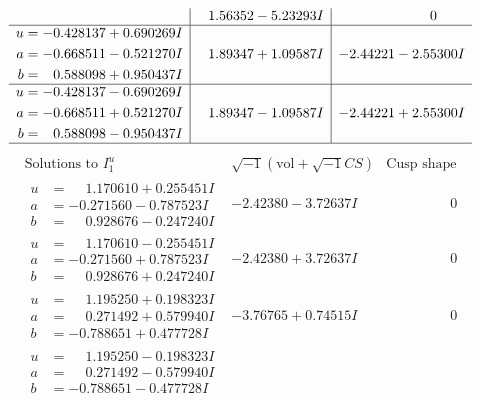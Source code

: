 \documentclass[1p]{elsarticle_modified}
\theoremstyle{definition}
\newcommand{\I}{\sqrt{-1}}
\begin{document}
$$\begin{array}{c|c|c}
 & \phantom{-}1.56352 - 5.23293 I & \phantom{-0.000000 } 0 \\ \hline\begin{aligned}
u &= -0.428137 + 0.690269 I \\
a &= -0.668511 - 0.521270 I \\
b &= \phantom{-}0.588098 + 0.950437 I\end{aligned}
 & \phantom{-}1.89347 + 1.09587 I & -2.44221 - 2.55300 I \\ \hline\begin{aligned}
u &= -0.428137 - 0.690269 I \\
a &= -0.668511 + 0.521270 I \\
b &= \phantom{-}0.588098 - 0.950437 I\end{aligned}
 & \phantom{-}1.89347 - 1.09587 I & -2.44221 + 2.55300 I\\
 \hline 
 \end{array}$$\newpage$$\begin{array}{c|c|c}  
\text{Solutions to }I^u_{1}& \I (\text{vol} + \sqrt{-1}CS) & \text{Cusp shape}\\
 \hline 
\begin{aligned}
u &= \phantom{-}1.170610 + 0.255451 I \\
a &= -0.271560 - 0.787523 I \\
b &= \phantom{-}0.928676 - 0.247240 I\end{aligned}
 & -2.42380 - 3.72637 I & \phantom{-0.000000 } 0 \\ \hline\begin{aligned}
u &= \phantom{-}1.170610 - 0.255451 I \\
a &= -0.271560 + 0.787523 I \\
b &= \phantom{-}0.928676 + 0.247240 I\end{aligned}
 & -2.42380 + 3.72637 I & \phantom{-0.000000 } 0 \\ \hline\begin{aligned}
u &= \phantom{-}1.195250 + 0.198323 I \\
a &= \phantom{-}0.271492 + 0.579940 I \\
b &= -0.788651 + 0.477728 I\end{aligned}
 & -3.76765 + 0.74515 I & \phantom{-0.000000 } 0 \\ \hline\begin{aligned}
u &= \phantom{-}1.195250 - 0.198323 I \\
a &= \phantom{-}0.271492 - 0.579940 I \\
b &= -0.788651 - 0.477728 I\end{aligned}

\end{array}$$
\end{document}
